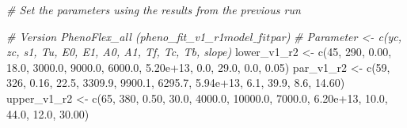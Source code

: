 \documentclass[
]{article}
\newenvironment{Shaded}{\begin{snugshade}}{\end{snugshade}}
\newcommand{\CommentTok}[1]{\textcolor[rgb]{0.56,0.35,0.01}{\textit{#1}}}
\newcommand{\DecValTok}[1]{\textcolor[rgb]{0.00,0.00,0.81}{#1}}
\newcommand{\FloatTok}[1]{\textcolor[rgb]{0.00,0.00,0.81}{#1}}
\newcommand{\FunctionTok}[1]{\textcolor[rgb]{0.00,0.00,0.00}{#1}}
\newcommand{\NormalTok}[1]{#1}
\newcommand{\OtherTok}[1]{\textcolor[rgb]{0.56,0.35,0.01}{#1}}
\begin{document}
\begin{Shaded}
\begin{Highlighting}[]
\CommentTok{\# Set the parameters using the results from the previous run}

\CommentTok{\# Version PhenoFlex\_all (pheno\_fit\_v1\_r1$model\_fit$par)}
\CommentTok{\# Parameter \textless{}{-} c(yc,  zc,   s1,   Tu,     E0,      E1,     A0,       A1,   Tf,   Tc,  Tb, slope)}
\NormalTok{lower\_v1\_r2 }\OtherTok{\textless{}{-}} \FunctionTok{c}\NormalTok{(}\DecValTok{45}\NormalTok{, }\DecValTok{290}\NormalTok{, }\FloatTok{0.00}\NormalTok{, }\FloatTok{18.0}\NormalTok{, }\FloatTok{3000.0}\NormalTok{,  }\FloatTok{9000.0}\NormalTok{, }\FloatTok{6000.0}\NormalTok{, }\FloatTok{5.20e+13}\NormalTok{,  }\FloatTok{0.0}\NormalTok{, }\FloatTok{29.0}\NormalTok{,  }\FloatTok{0.0}\NormalTok{,  }\FloatTok{0.05}\NormalTok{)}
\NormalTok{par\_v1\_r2   }\OtherTok{\textless{}{-}} \FunctionTok{c}\NormalTok{(}\DecValTok{59}\NormalTok{, }\DecValTok{326}\NormalTok{, }\FloatTok{0.16}\NormalTok{, }\FloatTok{22.5}\NormalTok{, }\FloatTok{3309.9}\NormalTok{,  }\FloatTok{9900.1}\NormalTok{, }\FloatTok{6295.7}\NormalTok{, }\FloatTok{5.94e+13}\NormalTok{,  }\FloatTok{6.1}\NormalTok{, }\FloatTok{39.9}\NormalTok{,  }\FloatTok{8.6}\NormalTok{, }\FloatTok{14.60}\NormalTok{)}
\NormalTok{upper\_v1\_r2 }\OtherTok{\textless{}{-}} \FunctionTok{c}\NormalTok{(}\DecValTok{65}\NormalTok{, }\DecValTok{380}\NormalTok{, }\FloatTok{0.50}\NormalTok{, }\FloatTok{30.0}\NormalTok{, }\FloatTok{4000.0}\NormalTok{, }\FloatTok{10000.0}\NormalTok{, }\FloatTok{7000.0}\NormalTok{, }\FloatTok{6.20e+13}\NormalTok{, }\FloatTok{10.0}\NormalTok{, }\FloatTok{44.0}\NormalTok{, }\FloatTok{12.0}\NormalTok{, }\FloatTok{30.00}\NormalTok{)}



\end{Highlighting}
\end{Shaded}
\end{document}
